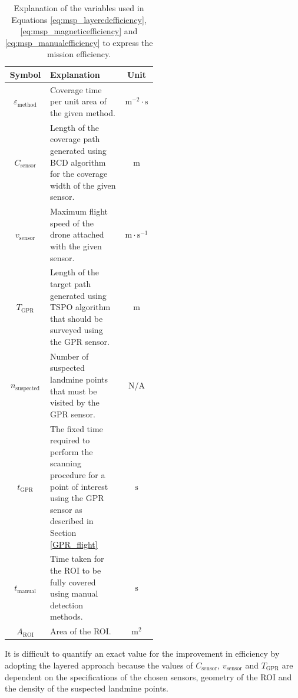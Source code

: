 \begin{table}[h!]
    \centering
    \begin{tabular}{c p{0.5\linewidth} c}
    \hline
        \textbf{Symbol} & \textbf{Explanation} & \textbf{Unit} \\
    \hline
        $\varepsilon_{\mathrm{method}}$ & Coverage time per unit area of the given method. & $\mathrm{m}^{-2} \cdot \mathrm{s}$ \\
        \hline
        $C_{\mathrm{sensor}}$ & Length of the coverage path generated using \gls{BCD} algorithm for the coverage width of the given sensor.  & $\mathrm{m}$ \\
        \hline
        $v_{\mathrm{sensor}}$ & Maximum flight speed of the drone attached with the given sensor. & $\mathrm{m} \cdot \mathrm{s}^{-1}$ \\
        \hline
        $T_{\mathrm{GPR}}$ & Length of the target path generated using \gls{TSPO} algorithm that should be surveyed using the \gls{GPR} sensor. & $\mathrm{m}$ \\
        \hline
        $n_{\mathrm{suspected}}$ & Number of suspected landmine points that must be visited by the \gls{GPR} sensor. & N/A \\
        \hline
        $t_{\mathrm{GPR}}$ & The fixed time required to perform the scanning procedure for a point of interest using the \gls{GPR} sensor as described in Section \ref{GPR_flight} & $\mathrm{s}$ \\
        \hline
        $t_{\mathrm{manual}}$ & Time taken for the \gls{ROI} to be fully covered using manual detection methods. & $\mathrm{s}$ \\
        \hline
        $A_{\mathrm{ROI}}$ & Area of the \gls{ROI}. & $\mathrm{m}^{2}$ \\
    \hline
    \end{tabular}
    \caption[Explanation of Variables for Mission Efficiency Expressions]
    {Explanation of the variables used in Equations \ref{eq:msp_layeredefficiency}, \ref{eq:msp_magneticefficiency} and \ref{eq:msp_manualefficiency} to express the mission efficiency.}
    \label{tab:msp_efficiencyvariables}
\end{table}

It is difficult to quantify an exact value for the improvement in efficiency by adopting the layered approach because the values of $C_{\mathrm{sensor}}$, $v_{\mathrm{sensor}}$ and $T_{\mathrm{GPR}}$ are dependent on the specifications of the chosen sensors, geometry of the \gls{ROI} and the density of the suspected landmine points. 

